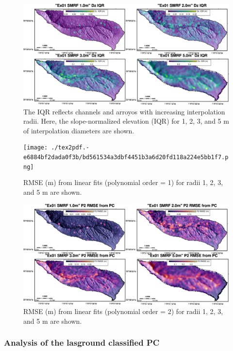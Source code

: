 \documentclass[a4paperpaper,,tablecaptionabove]{scrartcl}
\begin{document}
\begin{figure}
\centering
\includegraphics[width=\textwidth,height=0.9\textheight]{./tex2pdf.-e6884bf2dada0f3b/60a2504196ffb0c6844e21ac20c6cb5f3aaa7710.png}
\caption{The IQR reflects channels and arroyos with increasing
interpolation radii. Here, the slope-normalized elevation (IQR) for 1,
2, 3, and 5 m of interpolation diameters are shown.
\label{Fig:dz_IQR_1_2_3_5m}}
\end{figure}

\begin{figure}
\centering
\texttt{[image: ./tex2pdf.-e6884bf2dada0f3b/bd561534a3dbf4451b3a6d20fd118a224e5bb1f7.png]}
\caption{RMSE (m) from linear fits (polynomial order = 1) for radii 1,
2, 3, and 5 m are shown. \label{Fig:SMRF_RMSE_P1_1_2_3_5m}}
\end{figure}

\begin{figure}
\centering
\includegraphics[width=\textwidth,height=0.9\textheight]{./tex2pdf.-e6884bf2dada0f3b/6c1005ea0648fc15eceed92b7c39185b225a737e.png}
\caption{RMSE (m) from linear fits (polynomial order = 2) for radii 1,
2, 3, and 5 m are shown. \label{Fig:SMRF_RMSE_P2_1_2_3_5m}}
\end{figure}

\hypertarget{analysis-of-the-lasground-classified-pc}{%
\subsubsection{Analysis of the lasground classified
PC}\label{analysis-of-the-lasground-classified-pc}}
\end{document}
